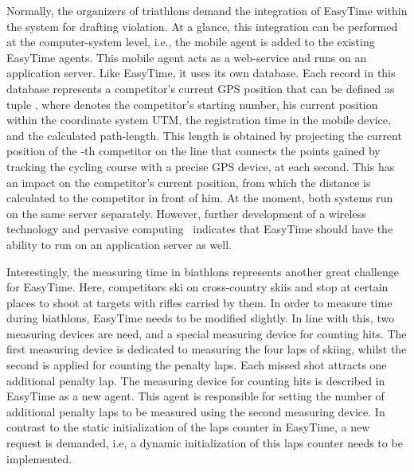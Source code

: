 \documentclass[preprint, prX]{revtex4}
\begin{document}
Normally, the organizers of triathlons demand the integration of EasyTime within the system for drafting violation. At a glance, this integration can be performed at the computer-system level, i.e., the mobile agent is added to the existing EasyTime agents. This mobile agent acts as a web-service and runs on an application server. Like EasyTime, it uses its own database. Each record in this database represents a competitor's current GPS position that can be defined as tuple , where  denotes the competitor's starting number,  his current position within the coordinate system UTM,  the registration time in the mobile device, and  the calculated path-length. This length  is obtained by projecting the current position of the -th competitor on the line that connects the points gained by tracking the cycling course with a precise GPS device, at each second. This has an impact on the competitor's current position, from which the distance is calculated to the competitor in front of him.
At the moment, both systems run on the same server separately.  However, further development of a wireless technology and pervasive computing~\cite{Weiser:1991} indicates that EasyTime should have the ability to run on an application server as well.

Interestingly, the measuring time in biathlons represents another great challenge for EasyTime. Here, competitors ski on cross-country skiis and stop at certain places to shoot at targets with rifles carried by them. In order to measure time during biathlons, EasyTime needs to be modified slightly. In line with this, two measuring devices are need, and a special measuring device for counting hits. The first measuring device is dedicated to measuring the four laps of skiing, whilst the second is applied for counting the penalty laps. Each missed shot attracts one additional penalty lap. The measuring device for counting hits is described in EasyTime as a new agent. This agent is responsible for setting the number of additional penalty laps to be measured using the second measuring device. In contrast to the static initialization of the laps counter in EasyTime, a new request is demanded, i.e, a dynamic initialization of this laps counter needs to be implemented.
\end{document}
